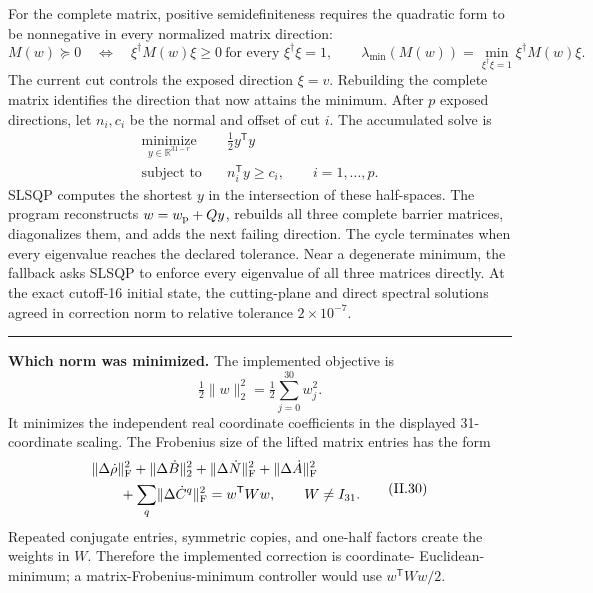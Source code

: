 \documentclass[10pt,letterpaper,twocolumn]{article}
\newcommand{\R}{\mathbb R}
\newcommand{\segmenthead}[1]{%
  \Needspace{5\baselineskip}%
  \par\medskip{\color{navy}\large\bfseries #1}\par
  \vspace{-2pt}{\color{navy}\rule{\columnwidth}{0.7pt}}\par\smallskip
}
\newcommand{\conceptbreak}{%
  \par\smallskip\noindent
  {\color{black!30}\rule{\columnwidth}{0.35pt}}%
  \par\smallskip
}
\begin{document}
For the complete matrix, positive semidefiniteness requires the quadratic form
to be nonnegative in every normalized matrix direction:
\[
M(w)\succeq0
\quad\Longleftrightarrow\quad
\xi^\dagger M(w)\xi\geq0
\ \text{for every }\xi^\dagger\xi=1,
\qquad
\lambda_{\min}(M(w))
=\min_{\xi^\dagger\xi=1}\xi^\dagger M(w)\xi.
\tag{II.28}
\]
The current cut controls the exposed direction \(\xi=v\).  Rebuilding the
complete matrix identifies the direction that now attains the minimum.  After
\(p\) exposed directions, let \(n_i,c_i\) be the normal and offset of cut
\(i\).  The accumulated solve is
\[
\begin{aligned}
\underset{y\in\R^{31-r}}{\operatorname{minimize}}\quad
&\tfrac12y^{\mathsf T}y\\
\text{subject to}\quad
&n_i^{\mathsf T}y\geq c_i,
\qquad i=1,\ldots,p.
\end{aligned}
\tag{II.28a}
\]
SLSQP computes the shortest \(y\) in the intersection of these half-spaces.
The program reconstructs \(w=w_{\rm p}+Qy\), rebuilds all three complete
barrier matrices, diagonalizes them, and adds the next failing direction.  The
cycle terminates when every eigenvalue reaches the declared tolerance.  Near a
degenerate minimum, the fallback asks SLSQP to enforce every eigenvalue of all
three matrices directly.  At the exact cutoff-16 initial state, the
cutting-plane and direct spectral solutions agreed in correction norm to
relative tolerance \(2\times10^{-7}\).

\conceptbreak
\textbf{Which norm was minimized.}
The implemented objective is
\[
\tfrac12\lVert w\rVert_2^2
=\tfrac12\sum_{j=0}^{30}w_j^2.
\tag{II.29}
\]
It minimizes the independent real coordinate coefficients in the displayed
31-coordinate scaling.  The Frobenius size of the lifted matrix entries has
the form
\[
\begin{aligned}
&\lVert\Delta\dot\rho\rVert_{\rm F}^2
+\lVert\Delta\dot B\rVert_2^2
+\lVert\Delta\dot N\rVert_{\rm F}^2
+\lVert\Delta\dot A\rVert_{\rm F}^2\\
&\qquad+\sum_q\lVert\Delta\dot C^q\rVert_{\rm F}^2
=w^{\mathsf T}Ww,
\qquad W\neq I_{31}.
\end{aligned}
\tag{II.30}
\]
Repeated conjugate entries, symmetric copies, and one-half factors create the
weights in \(W\).  Therefore the implemented correction is coordinate-
Euclidean-minimum; a matrix-Frobenius-minimum controller would use
\(w^{\mathsf T}Ww/2\).

\segmenthead{D. How the correction enters RK4}
\end{document}
